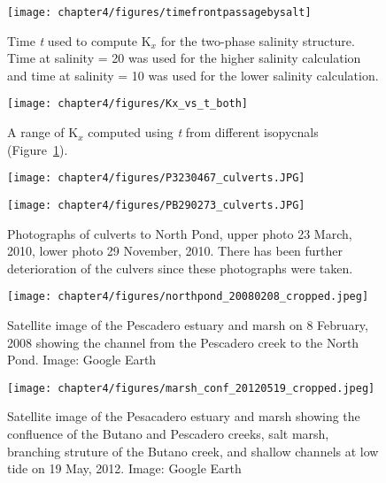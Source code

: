 \begin{figure}
	\texttt{[image: chapter4/figures/timefrontpassagebysalt]}
	\caption{Time \emph{t} used to compute K$_x$ for the two-phase salinity structure. Time at salinity = 20 was used for the higher salinity calculation and time at salinity = 10 was used for the lower salinity calculation.}  \label{fig:tvsS}
\end{figure}



\begin{figure}
	\texttt{[image: chapter4/figures/Kx\_vs\_t\_both]}
	\caption{A range of K$_x$ computed using \emph{t} from different isopycnals (Figure~\ref{fig:tvsS}).}  \label{fig:Kxvst}
\end{figure}



\begin{figure}
\centering
	\texttt{[image: chapter4/figures/P3230467\_culverts.JPG]}

	\texttt{[image: chapter4/figures/PB290273\_culverts.JPG]}

\caption{Photographs of culverts to North Pond, upper photo 23 March, 2010, lower photo 29 November, 2010. There has been further deterioration of the culvers since these photographs were taken.} \label{fig:photoCulverts}
\end{figure}





\begin{figure}
\centering
	\texttt{[image: chapter4/figures/northpond\_20080208\_cropped.jpeg]}
	\caption{Satellite image of the Pescadero estuary and marsh on 8 February, 2008 showing the channel from the Pescadero creek to the North Pond. Image: Google Earth} \label{fig:geNP}
\end{figure}


\begin{figure}
\centering
	\texttt{[image: chapter4/figures/marsh\_conf\_20120519\_cropped.jpeg]}
	\caption{Satellite image of the Pesacadero estuary and marsh showing the confluence of the Butano and Pescadero creeks, salt marsh, branching struture of the Butano creek, and shallow channels at low tide on 19 May, 2012. Image: Google Earth} \label{fig:geMarsh}
\end{figure}

